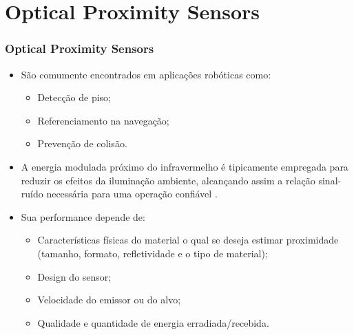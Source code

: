 \documentclass[xcolor=dvipsnames, aspectratio=169]{beamer}
\begin{document}
\section[Optical Proximity Sensors]{Optical Proximity Sensors} 
\begin{frame}
\frametitle{Optical Proximity Sensors}
	\begin{itemize}
		\item São comumente encontrados em aplicações robóticas como:
		\begin{itemize}
			\item Detecção de piso;
			\item Referenciamento na navegação;
			\item Prevenção de colisão.
		\end{itemize}
		\item A energia modulada próximo do infravermelho é tipicamente empregada para reduzir os efeitos da iluminação ambiente, alcançando assim a relação sinal-ruído necessária para uma operação confiável \cite{everett1995sensors}.
		\item Sua performance depende de:
		\begin{itemize}
			\item Características físicas do material o qual se deseja estimar proximidade (tamanho, formato, refletividade e o tipo de material);
			\item Design do sensor;
			\item Velocidade do emissor ou do alvo;
			\item Qualidade e quantidade de energia erradiada/recebida.
		\end{itemize}
		

\end{itemize}
\end{frame}
\end{document}
